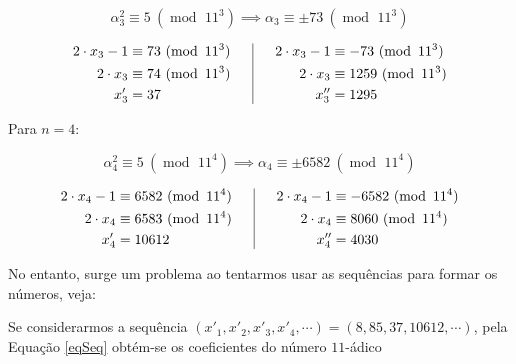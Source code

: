 \documentclass{report}
\DeclareMathOperator{\modulo}{mod \ }
\theoremstyle{definition}
\begin{document}
\begin{equation*}
    \alpha_3^2 \equiv 5 \ (\modulo 11^3) \implies \alpha_3 \equiv \pm 73 \ (\modulo 11^3)
\end{equation*}

\begin{equation*}
    \begin{aligned}[c]
        2 \cdot x_3 - 1 &\equiv 73 \ (\modulo 11^3)\\
        2 \cdot x_3 &\equiv 74 \ (\modulo 11^3)\\
        x'_3 &= 37
    \end{aligned}
    \hphantom{OO}\vline\hphantom{OO}
    \begin{aligned}[c]
        2 \cdot x_3 - 1 &\equiv -73 \ (\modulo 11^3)\\
        2 \cdot x_3 &\equiv 1259 \ (\modulo 11^3)\\
        x''_3 &= 1295
    \end{aligned}
\end{equation*}

Para $n = 4$:

\begin{equation*}
    \alpha_4^2 \equiv 5 \ (\modulo 11^4) \implies \alpha_4 \equiv \pm 6582 \ (\modulo 11^4)
\end{equation*}

\begin{equation*}
    \begin{aligned}[c]
        2 \cdot x_4 - 1 &\equiv 6582 \ (\modulo 11^4)\\
        2 \cdot x_4 &\equiv 6583 \ (\modulo 11^4)\\
        x'_4 &= 10612
    \end{aligned}
    \hphantom{OO}\vline\hphantom{OO}
    \begin{aligned}[c]
        2 \cdot x_4 - 1 &\equiv -6582 \ (\modulo 11^4)\\
        2 \cdot x_4 &\equiv 8060 \ (\modulo 11^4)\\
        x''_4 &= 4030
    \end{aligned}
\end{equation*}

No entanto, surge um problema ao tentarmos usar as sequências para formar os números, veja:

\bigskip

Se considerarmos a sequência $(x'_1, x'_2, x'_3, x'_4, \cdots) = (8, 85, 37, 10612, \cdots)$, pela Equação \ref{eqSeq} obtém-se os coeficientes do número $11$-ádico
\end{document}
